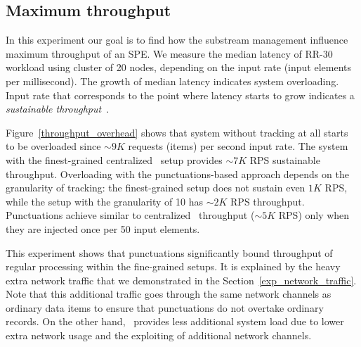 
\subsection{Maximum throughput}
In this experiment our goal is to find how the substream management influence maximum throughput of an SPE. We measure the median latency of RR-30 workload using cluster of 20 nodes, depending on the input rate (input elements per millisecond). The growth of median latency indicates system overloading. Input rate that corresponds to the point where latency starts to grow indicates a {\em sustainable throughput}~\cite{karimov2018benchmarking}.

Figure~\ref{throughput_overhead} shows that system without tracking at all starts to be overloaded since $\sim 9K$ requests (items) per second input rate. The system with the finest-grained centralized \tracker\ setup provides $\sim 7K$ RPS sustainable throughput. Overloading with the punctuations-based approach depends on the granularity of tracking: the finest-grained setup does not sustain even $1K$ RPS, while the setup with the granularity of 10 has $\sim 2K$ RPS throughput. Punctuations achieve similar to centralized \tracker\ throughput ($\sim 5K$ RPS) only when they are injected once per 50 input elements.

This experiment shows that punctuations significantly bound throughput of regular processing within the fine-grained setups. It is explained by the heavy extra network traffic that we demonstrated in the Section~\ref{exp_network_traffic}. Note that this additional traffic goes through the same network channels as ordinary data items to ensure that punctuations do not overtake ordinary records. On the other hand, \tracker\ provides less additional system load due to lower extra network usage and the exploiting of additional network channels.


